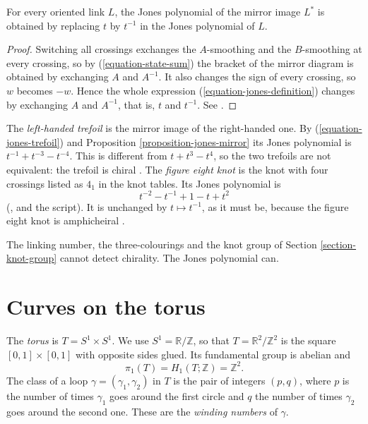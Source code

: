 \begin{proposition}
\label{proposition-jones-mirror}
For every oriented link $L$, the Jones
polynomial of the mirror image $L^{*}$
is obtained by replacing $t$ by
$t^{-1}$ in the Jones polynomial of
$L$.
\end{proposition}

\begin{proof}
Switching all crossings exchanges the
$A$-smoothing and the $B$-smoothing at
every crossing, so by
(\ref{equation-state-sum}) the bracket
of the mirror diagram is obtained by
exchanging $A$ and $A^{-1}$. It also
changes the sign of every crossing, so
$w$ becomes $-w$. Hence the whole
expression
(\ref{equation-jones-definition})
changes by exchanging $A$ and $A^{-1}$,
that is, $t$ and $t^{-1}$. See
\cite[Chapter 11, Section 2]{murasugi}.
\end{proof}

\begin{example}
\label{example-trefoil-chiral}
The {\it left-handed trefoil} is the
mirror image of the right-handed one.
By (\ref{equation-jones-trefoil}) and
Proposition \ref{proposition-jones-mirror}
its Jones polynomial is
$t^{-1}+t^{-3}-t^{-4}$. This is
different from $t+t^{3}-t^{4}$, so the
two trefoils are not equivalent: the
trefoil is chiral
\cite[Example 11.2.1]{murasugi}.
The {\it figure eight knot} is the knot
with four crossings listed as $4_1$ in
the knot tables. Its Jones polynomial
is
$$
t^{-2}-t^{-1}+1-t+t^{2}
$$
(\cite[Table 3.1]{lickorish}, and the
script). It is unchanged by
$t\mapsto t^{-1}$, as it must be,
because the figure eight knot is
amphicheiral \cite[p.\ 43]{murasugi}.
\end{example}

\noindent
The linking number, the
three-colourings and the knot group of
Section \ref{section-knot-group} cannot
detect chirality. The Jones polynomial
can.

\section{Curves on the torus}
\label{section-curves-on-torus}

\noindent
The {\it torus} is
$T=S^1\times S^1$. We use
$S^1=\mathbb{R}/\mathbb{Z}$, so that
$T=\mathbb{R}^2/\mathbb{Z}^2$ is the
square $[0,1]\times[0,1]$ with opposite
sides glued. Its fundamental group is
abelian and
$$
\pi_1(T)=H_1(T;\mathbb{Z})
=\mathbb{Z}^2.
$$
The class of a loop
$\gamma=(\gamma_1,\gamma_2)$ in $T$ is
the pair of integers $(p,q)$, where $p$
is the number of times $\gamma_1$ goes
around the first circle and $q$ the
number of times $\gamma_2$ goes around
the second one. These are the
{\it winding numbers} of $\gamma$.

